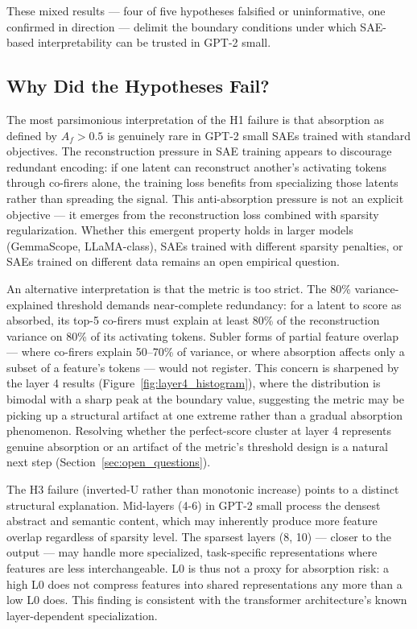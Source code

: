 \documentclass{article}
\begin{document}
These mixed results --- four of five hypotheses falsified or uninformative, one confirmed in direction --- delimit the boundary conditions under which SAE-based interpretability can be trusted in GPT-2 small.

\subsection{Why Did the Hypotheses Fail?}

The most parsimonious interpretation of the H1 failure is that absorption as defined by $A_f > 0.5$ is genuinely rare in GPT-2 small SAEs trained with standard objectives. The reconstruction pressure in SAE training appears to discourage redundant encoding: if one latent can reconstruct another's activating tokens through co-firers alone, the training loss benefits from specializing those latents rather than spreading the signal. This anti-absorption pressure is not an explicit objective --- it emerges from the reconstruction loss combined with sparsity regularization. Whether this emergent property holds in larger models (GemmaScope, LLaMA-class), SAEs trained with different sparsity penalties, or SAEs trained on different data remains an open empirical question.

An alternative interpretation is that the metric is too strict. The 80\% variance-explained threshold demands near-complete redundancy: for a latent to score as absorbed, its top-5 co-firers must explain at least 80\% of the reconstruction variance on 80\% of its activating tokens. Subler forms of partial feature overlap --- where co-firers explain 50--70\% of variance, or where absorption affects only a subset of a feature's tokens --- would not register. This concern is sharpened by the layer 4 results (Figure~\ref{fig:layer4_histogram}), where the distribution is bimodal with a sharp peak at the boundary value, suggesting the metric may be picking up a structural artifact at one extreme rather than a gradual absorption phenomenon. Resolving whether the perfect-score cluster at layer 4 represents genuine absorption or an artifact of the metric's threshold design is a natural next step (Section~\ref{sec:open_questions}).

The H3 failure (inverted-U rather than monotonic increase) points to a distinct structural explanation. Mid-layers (4-6) in GPT-2 small process the densest abstract and semantic content, which may inherently produce more feature overlap regardless of sparsity level. The sparsest layers (8, 10) --- closer to the output --- may handle more specialized, task-specific representations where features are less interchangeable. L0 is thus not a proxy for absorption risk: a high L0 does not compress features into shared representations any more than a low L0 does. This finding is consistent with the transformer architecture's known layer-dependent specialization.
\end{document}
